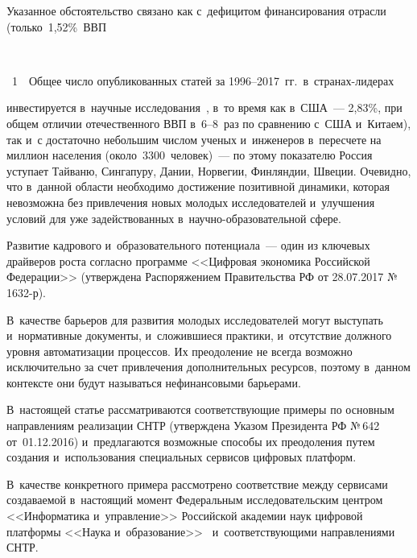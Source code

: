 \begin{multicols}{2}
Указанное обстоятельство связано как с~дефицитом финансирования отрасли 
(только~1{,}52\%~ВВП\linebreak\vspace*{-12pt}

{ \begin{center}  %
 \vspace*{1pt}
  \mbox{%
 \epsfxsize=79mm 
 }


\end{center}


\noindent
{{\figurename~1}\ \ \small{Общее число опубликованных статей за 1996--2017~гг.\ в~стра\-нах-ли\-де\-рах}}
}

\vspace*{12pt}

\addtocounter{figure}{1}




\noindent
инвестируется в~научные исследования~\cite{GlobalRD2018}, 
в~то время как в~США~--- 2{,}83\%, при общем отличии отечественного ВВП в~6--8~раз 
по сравнению с~США и~Китаем), так и~с достаточно небольшим числом ученых и~инженеров 
в~пересчете на миллион населения (около~3300~человек)~--- 
по этому показателю Россия уступает Тайваню, Сингапуру, Дании, Норвегии, 
Финляндии, Швеции. Очевидно, что в~данной области необходимо достижение позитивной 
динамики, которая невозможна без привлечения новых молодых исследователей и~улучшения 
условий для уже задействованных в~на\-уч\-но-об\-ра\-зо\-ва\-тель\-ной сфере.


Развитие кадрового и~образовательного потенциала~--- один из ключевых драйверов 
роста согласно программе <<Цифровая экономика Российской Федерации>> 
(утверждена Распоряжением Правительства РФ от 28.07.2017 №\,1632-р). 

В~качестве барьеров для развития молодых исследователей могут выступать и~нормативные 
документы, и~сложившиеся практики, и~отсутствие должного уровня автоматизации 
процессов. Их преодоление не всегда возможно исключительно за счет привлечения 
дополнительных ресурсов, поэтому в~данном контексте они будут называться 
нефинансовыми барь\-е\-ра\-ми. 

В~настоящей статье рассматриваются соответствующие 
примеры по основным направлениям реализации СНТР (утверждена Указом Президента РФ №\,642 
от~01.12.2016) и~предлагаются возможные способы их преодоления путем создания 
и~использования специальных сервисов цифровых платформ. 

В~качестве конкретного примера рассмотрено соответствие между сервисами 
создаваемой в~настоящий момент Федеральным исследовательским центром 
<<Информатика и~управление>> Российской академии наук цифровой платформы 
<<Наука и~образование>>~\cite{Gorshenin2017} и~соответствующими направлениями СНТР.


\end{multicols}
